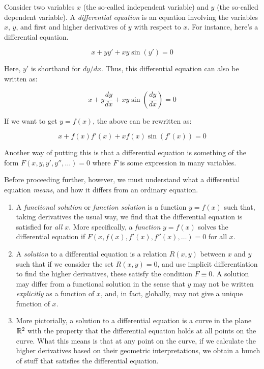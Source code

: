 \documentclass{amsart}
\begin{document}
Consider two variables $x$ (the so-called independent variable) and
$y$ (the so-called dependent variable). A {\em differential equation}
is an equation involving the variables $x$, $y$, and first and higher
derivatives of $y$ with respect to $x$. For instance, here's a
differential equation.

$$x + yy' + xy\sin(y') = 0$$

Here, $y'$ is shorthand for $dy/dx$. Thus, this differential equation
can also be written as:

$$x + y\frac{dy}{dx} + xy \sin\left(\frac{dy}{dx}\right) = 0$$

If we want to get $y = f(x)$, the above can be rewritten as:

$$x + f(x)f'(x) + xf(x)\sin(f'(x)) = 0$$

Another way of putting this is that a differential equation is
something of the form $F(x,y,y',y'', \dots) = 0$ where $F$ is some
expression in many variables.

Before proceeding further, however, we must understand what a
differential equation {\em means}, and how it differs from an ordinary
equation.

\begin{enumerate}
\item A {\em functional solution} or {\em function solution} is a
  function $y = f(x)$ such that, taking derivatives the usual way, we
  find that the differential equation is satisfied for {\em all} $x$.
  More specifically, a {\em function} $y = f(x)$ solves the
  differential equation if $F(x,f(x),f'(x),f''(x),\dots) = 0$ for all
  $x$.

\item A {\em solution} to a differential equation is a relation
  $R(x,y)$ between $x$ and $y$ such that if we consider the set
  $R(x,y) = 0$, and use implicit differentiation to find the higher
  derivatives, these satisfy the condition $F \equiv 0$. A solution
  may differ from a functional solution in the sense that $y$ may not
  be written {\em explicitly} as a function of $x$, and, in fact,
  globally, may not give a unique function of $x$.
\item More pictorially, a solution to a differential equation is a
  curve in the plane $\mathbb{R}^2$ with the property that the differential
  equation holds at all points on the curve. What this means is that
  at any point on the curve, if we calculate the higher derivatives
  based on their geometric interpretations, we obtain a bunch of stuff
  that satisfies the differential equation.
\end{enumerate}
\end{document}
